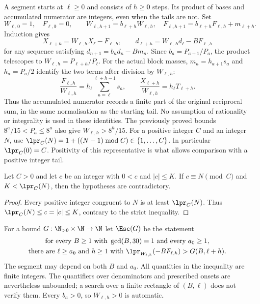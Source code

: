 A segment starts at $\ell\ge0$ and consists of $h\ge0$ steps.  Its product
of bases and accumulated numerator are integers, even when the tails are
not.  Set
\[
 W_{\ell,0}=1,\quad F_{\ell,0}=0,\qquad
 W_{\ell,h+1}=b_{\ell+h}W_{\ell,h},\quad
 F_{\ell,h+1}=b_{\ell+h}F_{\ell,h}+m_{\ell+h}.
\]
Induction gives
\begin{equation}\label{long269:eq:window-identity}
 X_{\ell+h}=W_{\ell,h}X_\ell-F_{\ell,h},\qquad
 d_{\ell+h}=W_{\ell,h}d_\ell-BF_{\ell,h}
\end{equation}
for any sequence satisfying $d_{n+1}=b_nd_n-Bm_n$.
Since $b_a=P_{a+1}/P_a$, the product telescopes to
$W_{\ell,h}=P_{\ell+h}/P_\ell$.  For the actual block masses,
$m_a=h_{a+1}s_a$ and $h_a=P_a/2$ identify the two terms after division
by $W_{\ell,h}$:
\[
 \frac{F_{\ell,h}}{W_{\ell,h}}
 =h_\ell\sum_{a=\ell}^{\ell+h-1}s_a,
 \qquad
 \frac{X_{\ell+h}}{W_{\ell,h}}=h_\ell T_{\ell+h}.
\]
Thus the accumulated numerator records a finite part of the original
reciprocal sum, in the same normalisation as the starting tail. No
assumption of rationality or integrality is used in these identities.
The previously proved bounds $8^a/15<P_a\le8^a$ also give
$W_{\ell,h}>8^h/15$.
For a positive integer $C$ and an integer $N$, use
$\lpr_C(N)=1+((N-1)\bmod C)\in\{1,\ldots,C\}$.
In particular $\lpr_C(0)=C$.  Positivity of this representative is what
allows comparison with a positive integer tail.

\begin{proposition}\label{long269:res:consumer}
Let $C>0$ and let $c$ be an integer with $0<c$ and $|c|\le K$.  If
$c\equiv N\pmod C$ and $K<\lpr_C(N)$, then the hypotheses are contradictory.
\end{proposition}

\begin{proof}
Every positive integer congruent to $N$ is at least $\lpr_C(N)$.
Thus $\lpr_C(N)\le c=|c|\le K$, contrary to the strict inequality.
\end{proof}


For a bound $G:\N_{>0}\times\N\to\N$ let $\Esc(G)$ be the statement
\begin{equation}\label{long269:eq:actual-escape}
 \begin{gathered}
 \text{for every }B\ge1\text{ with }\gcd(B,30)=1\text{ and every }a_0\ge1,\\
 \text{there are }\ell\ge a_0\text{ and }h\ge1\text{ with }
 \lpr_{W_{\ell,h}}(-BF_{\ell,h})>G(B,\ell+h) .
 \end{gathered}
\end{equation}
The segment may depend on both $B$ and $a_0$.  All quantities in the
inequality are finite integers.  The quantifiers over denominators and
prescribed onsets are nevertheless unbounded; a search over a finite
rectangle of $(B,\ell)$ does not verify them.  Every $b_a>0$, so
$W_{\ell,h}>0$ is automatic.

